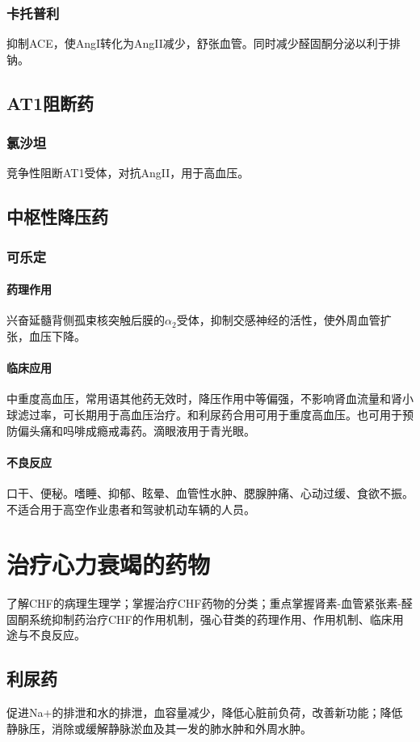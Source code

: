 \documentclass[UTF8]{ctexbook}
\begin{document}
\subsection{卡托普利}
抑制ACE，使AngI转化为AngII减少，舒张血管。同时减少醛固酮分泌以利于排钠。
\section{AT1阻断药}
\subsection{氯沙坦}
竞争性阻断AT1受体，对抗AngII，用于高血压。
\section{中枢性降压药}
\subsection{可乐定}
\subsubsection{药理作用}
兴奋延髓背侧孤束核突触后膜的\(\alpha_{2}\)受体，抑制交感神经的活性，使外周血管扩张，血压下降。
\subsubsection{临床应用}
中重度高血压，常用语其他药无效时，降压作用中等偏强，不影响肾血流量和肾小球滤过率，可长期用于高血压治疗。和利尿药合用可用于重度高血压。也可用于预防偏头痛和吗啡成瘾戒毒药。滴眼液用于青光眼。
\subsubsection{不良反应}
口干、便秘。嗜睡、抑郁、眩晕、血管性水肿、腮腺肿痛、心动过缓、食欲不振。不适合用于高空作业患者和驾驶机动车辆的人员。

\chapter{治疗心力衰竭的药物}
了解CHF的病理生理学；掌握治疗CHF药物的分类；重点掌握肾素-血管紧张素-醛固酮系统抑制药治疗CHF的作用机制，强心苷类的药理作用、作用机制、临床用途与不良反应。
\section{利尿药}促进Na+的排泄和水的排泄，血容量减少，降低心脏前负荷，改善新功能；降低静脉压，消除或缓解静脉淤血及其一发的肺水肿和外周水肿。
\end{document}
